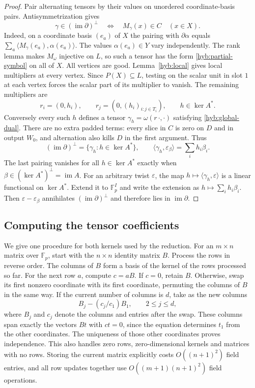 \documentclass[11pt]{article}
\newcommand{\F}{\mathbb F_p}
\DeclareMathOperator{\im}{im}
\theoremstyle{definition}
\theoremstyle{remark}
\numberwithin{equation}{section}
\begin{document}
\begin{proof}
Pair alternating tensors by their values on unordered coordinate-basis
pairs.  Antisymmetrization gives
\begin{equation}
 \gamma\in(\im\partial)^\perp
 \quad\Longleftrightarrow\quad M_\gamma(x)\in C\quad(x\in X).
 \label{hyb:global-dual}
\end{equation}
Indeed, on a coordinate basis $(e_a)$ of $X$ the pairing with
$\partial\alpha$ equals
$\sum_a\langle M_\gamma(e_a),\alpha(e_a)\rangle$.
The values $\alpha(e_a)\in Y$ vary independently. The rank lemma
makes $M_\omega$ injective on $L$, so such a tensor has
the form \eqref{hyb:partial-symbol} on all of $X$.  All vertices are good.
Lemma~\ref{hyb:local} gives local multipliers at every vertex.
Since $P(X)\subseteq L$, testing on the scalar unit in slot $1$ at
each vertex forces the scalar part of its multiplier to vanish.  The remaining multipliers are
\[
 r_i=(0,h_i),\qquad r_j=(0,(h_i)_{i:j\in T_i}),\qquad h\in\ker A^*.
\]
Conversely every such $h$ defines a tensor $\gamma_h=\omega(r\,\cdot,\cdot)$
satisfying \eqref{hyb:global-dual}.  There are no extra padded terms:
every slice in $C$ is zero on $D$ and in output $W_0$, and alternation
also kills $D$ in the first argument.  Thus
\[
 (\im\partial)^\perp=\{\gamma_h:h\in\ker A^*\},\qquad
 \langle\gamma_h,\varepsilon_\beta\rangle=\sum_i h_i\beta_i.
\]
The last pairing vanishes for all $h\in\ker A^*$ exactly when
$\beta\in(\ker A^*)^\perp=\im A$. For an arbitrary twist $\varepsilon$,
the map $h\mapsto\langle\gamma_h,\varepsilon\rangle$ is a linear
functional on $\ker A^*$. Extend it to $\F^I$ and write the extension
as $h\mapsto\sum_i h_i\beta_i$. Then
$\varepsilon-\varepsilon_\beta$ annihilates $(\im\partial)^\perp$
and therefore lies in $\im\partial$.
\end{proof}

\subsection{Computing the tensor coefficients}
\label{sec:gaussian-bases}

We give one procedure for both kernels used by the reduction.
For an $m\times n$ matrix over $\F$, start with the $n\times n$
identity matrix $B$. Process the rows in reverse order. The columns
of $B$ form a basis of the kernel of the rows processed so far.
For the next row $a$, compute $c=aB$. If $c=0$, retain $B$.
Otherwise, swap its first nonzero coordinate with its first coordinate,
permuting the columns of $B$ in the same way. If the current number of
columns is $d$, take as the new columns
\[
 B_j-(c_j/c_1)B_1,\qquad 2\le j\le d,
\]
where $B_j$ and $c_j$ denote the columns and entries after the swap.
These columns span exactly the vectors $Bt$ with $ct=0$, since the
equation determines $t_1$ from the other coordinates. The uniqueness
of those other coordinates proves independence. This also handles
zero rows, zero-dimensional kernels and matrices with no rows.
Storing the current matrix explicitly costs $O((n+1)^2)$ field
entries, and all row updates together use
$O((m+1)(n+1)^2)$ field operations.
\end{document}
